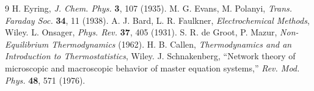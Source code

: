 \documentclass[11pt,a4paper]{article}
\begin{document}
\begin{thebibliography}{9}
 H. Eyring, \emph{J. Chem. Phys.} \textbf{3}, 107 (1935).
 M. G. Evans, M. Polanyi, \emph{Trans. Faraday Soc.} \textbf{34}, 11 (1938).
 A. J. Bard, L. R. Faulkner, \emph{Electrochemical Methods}, Wiley.
 L. Onsager, \emph{Phys. Rev.} \textbf{37}, 405 (1931).
 S. R. de Groot, P. Mazur, \emph{Non-Equilibrium Thermodynamics} (1962).
 H. B. Callen, \emph{Thermodynamics and an Introduction to Thermostatistics}, Wiley.
 J. Schnakenberg, ``Network theory of microscopic and macroscopic behavior of master equation systems,'' \emph{Rev. Mod. Phys.} \textbf{48}, 571 (1976).
\end{thebibliography}
\end{document}
